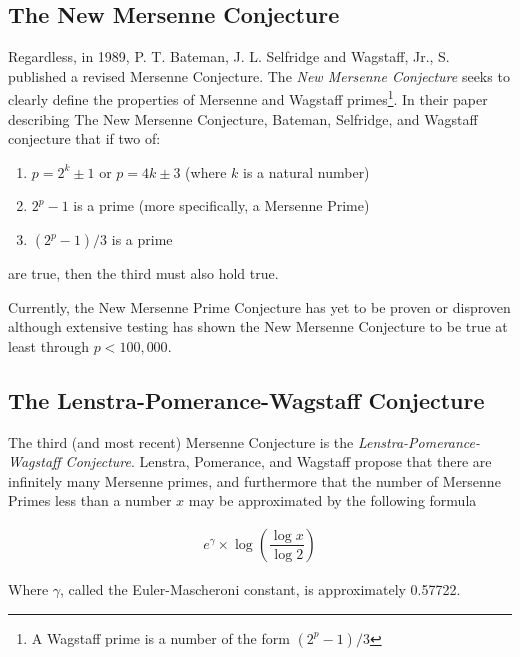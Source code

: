 \subsection{The New Mersenne Conjecture}

Regardless, in 1989, P. T. Bateman, J. L. Selfridge and Wagstaff, Jr., S. published a revised Mersenne Conjecture.
The \textit{New Mersenne Conjecture} seeks to clearly define the properties of Mersenne and Wagstaff primes\footnote{A Wagstaff prime is a number of the form $(2^p-1)/3$}.
In their paper describing The New Mersenne Conjecture, Bateman, Selfridge, and Wagstaff conjecture that if two of: 
\begin{enumerate}
\item $p = 2^k \pm 1$ or $p = 4k \pm 3$ (where $k$ is a natural number)
\item $2^p - 1$ is a prime (more specifically, a Mersenne Prime)
\item $(2^p - 1)/3$ is a prime
\end{enumerate}
are true, then the third must also hold true.

Currently, the New Mersenne Prime Conjecture has yet to be proven or disproven although extensive testing
has shown the New Mersenne Conjecture to be true at least through $p < 100,000$.

\subsection{The Lenstra-Pomerance-Wagstaff Conjecture}

The third (and most recent) Mersenne Conjecture is the \textit{Lenstra-Pomerance-Wagstaff Conjecture}. 
Lenstra, Pomerance, and Wagstaff propose that there are infinitely many Mersenne primes, and furthermore
that the number of Mersenne Primes less than a number $x$ may be approximated by the following formula~\cite{utm.edu-heuristic}

\begin{align}
e^{\gamma} \times \log \left( \dfrac{\log{x}}{\log{2}} \right)
\end{align}

Where $\gamma$, called the Euler-Mascheroni constant, is approximately 0.57722.
